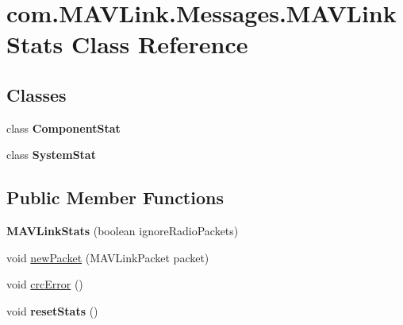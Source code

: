\hypertarget{classcom_1_1MAVLink_1_1Messages_1_1MAVLinkStats}{}\section{com.\+M\+A\+V\+Link.\+Messages.\+M\+A\+V\+Link\+Stats Class Reference}
\label{classcom_1_1MAVLink_1_1Messages_1_1MAVLinkStats}
\subsection*{Classes}
\begin{DoxyCompactItemize}
\item 
class {\bfseries Component\+Stat}
\item 
class {\bfseries System\+Stat}
\end{DoxyCompactItemize}
\subsection*{Public Member Functions}
\begin{DoxyCompactItemize}
\item 
\mbox{\label{classcom_1_1MAVLink_1_1Messages_1_1MAVLinkStats_a53a7b219944fb2bf8d147a031a1af65e}} 
{\bfseries M\+A\+V\+Link\+Stats} (boolean ignore\+Radio\+Packets)
\item 
void \hyperlink{classcom_1_1MAVLink_1_1Messages_1_1MAVLinkStats_aa1601a2fcc7ff51f2aa577272337bf8a}{new\+Packet} (M\+A\+V\+Link\+Packet packet)
\item 
void \hyperlink{classcom_1_1MAVLink_1_1Messages_1_1MAVLinkStats_a15deaa3b7c3753cc5a4cd11332f05182}{crc\+Error} ()
\item 
\mbox{\label{classcom_1_1MAVLink_1_1Messages_1_1MAVLinkStats_a265bed2364d06155083538d3d258ee46}} 
void {\bfseries reset\+Stats} ()
\end{DoxyCompactItemize}
